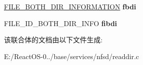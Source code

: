 \begin{DoxyCompactItemize}
\mbox{\label{union___f_i_l_e___d_i_r___i_n_f_o___u_n_i_o_n_a94aad8165ab4e0af0cc6a76b7edd3e31}} 
\hyperlink{struct___f_i_l_e___b_o_t_h___d_i_r___i_n_f_o_r_m_a_t_i_o_n}{F\+I\+L\+E\+\_\+\+B\+O\+T\+H\+\_\+\+D\+I\+R\+\_\+\+I\+N\+F\+O\+R\+M\+A\+T\+I\+ON} {\bfseries fbdi}
\item 
\mbox{\label{union___f_i_l_e___d_i_r___i_n_f_o___u_n_i_o_n_a2940b9f256309d56caa63336f0d3e837}} 
F\+I\+L\+E\+\_\+\+I\+D\+\_\+\+B\+O\+T\+H\+\_\+\+D\+I\+R\+\_\+\+I\+N\+FO {\bfseries fibdi}
\end{DoxyCompactItemize}


该联合体的文档由以下文件生成\+:\begin{DoxyCompactItemize}
\item 
E\+:/\+React\+O\+S-\/0../base/services/nfsd/readdir.\+c\end{DoxyCompactItemize}
